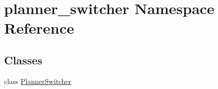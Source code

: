 \hypertarget{namespaceplanner__switcher}{}\section{planner\+\_\+switcher Namespace Reference}
\label{namespaceplanner__switcher}
\subsection*{Classes}
\begin{DoxyCompactItemize}
\item 
class \hyperlink{classplanner__switcher_1_1PlannerSwitcher}{Planner\+Switcher}
\end{DoxyCompactItemize}

